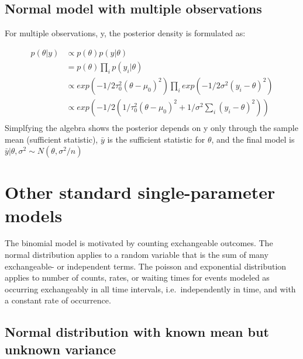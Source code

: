 \documentclass[
]{book}
\theoremstyle{definition}
\theoremstyle{definition}
\theoremstyle{definition}
\theoremstyle{definition}
\theoremstyle{remark}
\begin{document}
\hypertarget{normal-model-with-multiple-observations}{%
\subsection*{Normal model with multiple observations}\label{normal-model-with-multiple-observations}}

For multiple observations, y, the posterior density is formulated as:

\[
\begin{aligned}
 p(\theta | y ) &\propto p(\theta)p(y|\theta) \\
   &=p(\theta)\prod_i p(y_i | \theta)\\
   &\propto exp(-1/2\tau_0^2 (\theta-\mu_0)^2)\prod_i exp(-1/2\sigma^2 (y_i -\theta)^2)\\
   &\propto exp(-1/2 (1/\tau_0^2(\theta-\mu_0)^2+ 1/\sigma^2\sum_i(y_i-\theta)^2) )\\
 \end{aligned}
\]
Simplfying the algebra shows the posterior depends on y only through the sample mean (sufficient statistic), \(\bar{y}\) is the sufficient statistic for \(\theta\), and the final model is \(\bar{y} | \theta,\sigma^2 \sim N(\theta, \sigma^2/n)\)

\hypertarget{other-standard-single-parameter-models}{%
\section{Other standard single-parameter models}\label{other-standard-single-parameter-models}}

The binomial model is motivated by counting exchangeable outcomes. The normal distribution applies to a random variable that is the sum of many exchangeable- or independent terms. The poisson and exponential distribution applies to number of counts, rates, or waiting times for events modeled as occurring exchangeably in all time intervals, i.e.~independently in time, and with a constant rate of occurrence.

\hypertarget{normal-distribution-with-known-mean-but-unknown-variance}{%
\subsection*{Normal distribution with known mean but unknown variance}\label{normal-distribution-with-known-mean-but-unknown-variance}}
\end{document}

